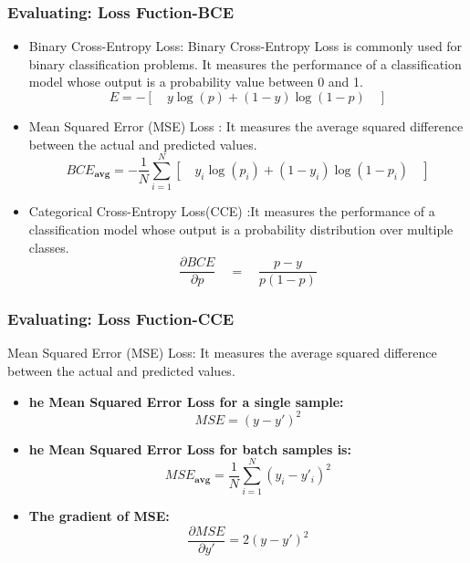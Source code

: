\documentclass[aspectratio=1610]{beamer}
\begin{document}
\begin{frame}
    \frametitle{Evaluating: Loss Fuction-BCE}
    \begin{itemize}

        \item Binary Cross-Entropy Loss: Binary Cross-Entropy Loss is commonly used for binary classification problems. It measures the performance of a classification model whose output is a probability value between 0 and 1.    
            \[
              E = -\left[\quad y \log(p) + (1 - y) \log(1 - p) \quad\right]
            \]

        \item Mean Squared Error (MSE) Loss  : It measures the average squared difference between the actual and predicted values.
            \[
                BCE_{\textbf{avg}} = - \frac{1}{N} \sum_{i=1}^{N} \left[\quad y_i \log(p_i) + (1 - y_i) \log(1 - p_i) \quad\right]
            \]
        \item Categorical Cross-Entropy Loss(CCE) :It measures the performance of a classification model whose output is a probability distribution over multiple classes. 
            \[
            \frac{\partial BCE }{\partial p}  \quad=\quad \frac{p-y }{p(1-p)} \]
    \end{itemize}
\end{frame}

\begin{frame}
    \frametitle{Evaluating: Loss Fuction-CCE}
    Mean Squared Error (MSE) Loss: 
    It measures the average squared difference between the actual and predicted values. 
    \vspace{0.5cm}
    \begin{itemize}

        \item \textbf{he Mean Squared Error Loss for a single sample:}
        \[
            MSE = (y - y')^2
        \]

        \item \textbf{he Mean Squared Error Loss for batch samples is:}
        \[
        MSE_{\textbf{avg}}= \frac{1}{N} \sum_{i=1}^{N} (y_i - y'_i)^2
        \]
        \item \textbf{The gradient of MSE:}
       \[
       \frac{\partial MSE}{\partial y'} =  2(y-y')^2
       \]
    \end{itemize}
\end{frame}
\end{document}
